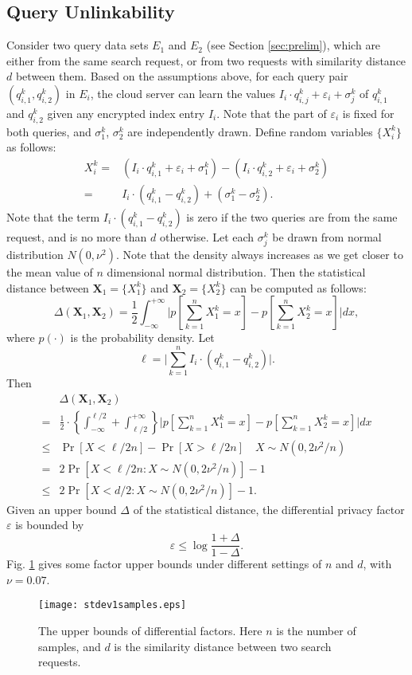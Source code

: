 \documentclass{IEEEtran}
\begin{document}
\subsection{Query Unlinkability}
Consider two query data sets $E_1$ and $E_2$ (see Section \ref{sec:prelim}), which are either from the same search request, or from two requests with similarity distance $d$ between them. Based on the assumptions above, for each query pair $(q_{i,1}^k,q_{i,2}^k)$ in $E_i$, the cloud server can learn the values $I_i\cdot q_{i,j}^k+\varepsilon_i+\sigma_j^k$ of $q_{i,1}^k$ and $q_{i,2}^k$ given any encrypted index entry $I_i$. Note that the part of $\varepsilon_i$ is fixed for both queries, and $\sigma_1^k$, $\sigma_2^k$ are independently drawn. Define random variables $\{X_i^k\}$ as follows:
$$
\begin{aligned}
X_i^k = &(I_i\cdot q_{i,1}^k+\varepsilon_i+\sigma_1^k) - (I_i\cdot q_{i,2}^k+\varepsilon_i+\sigma_2^k)\\
=&I_i\cdot(q_{i,1}^k-q_{i,2}^k)+(\sigma_1^k-\sigma_2^k).
\end{aligned}
$$
Note that the term $I_i\cdot(q_{i,1}^k-q_{i,2}^k)$ is zero if the two queries are from the same request, and is no more than $d$ otherwise. Let each $\sigma_j^k$ be drawn from normal distribution $N(0,\nu^2)$. Note that the density always increases as we get closer to the mean value of $n$ dimensional normal distribution. Then the statistical distance between $\mathbf{X}_1 = \{X_1^k\}$ and $\mathbf{X}_2 = \{X_2^k\}$ can be computed as follows:
$$\Delta(\mathbf{X}_1, \mathbf{X}_2) = \frac{1}{2}\int_{-\infty}^{+\infty}\bigg|p[\sum_{k=1}^n X_1^k = x] - p[\sum_{k=1}^n X_2^k = x]\bigg|dx,$$
where $p(\cdot)$ is the probability density. Let 
$$\ell = \bigg| \sum_{k=1}^n I_i\cdot(q_{i,1}^k-q_{i,2}^k) \bigg|.$$
Then
$$
\begin{aligned}
&\Delta(\mathbf{X}_1, \mathbf{X}_2) \\
=& \frac{1}{2}\cdot\left\{ \int_{-\infty}^{\ell/2} + \int_{\ell/2}^{+\infty} \right\} \bigg|p[\sum_{k=1}^n X_1^k = x] - p[\sum_{k=1}^n X_2^k = x]\bigg|dx \\
\leq& \Pr[X<\ell/2n] - \Pr[X>\ell/2n] \quad X\sim N(0,2\nu^2/n) \\
=& 2\Pr[X<\ell/2n: X\sim N(0,2\nu^2/n)]-1 \\
\leq& 2\Pr[X<d/2: X\sim N(0,2\nu^2/n)]-1.
\end{aligned}
$$
Given an upper bound $\Delta$ of the statistical distance, the differential privacy factor $\varepsilon$ is bounded by
$$\varepsilon \leq \log \frac{1+\Delta}{1-\Delta}.$$
Fig. \ref{fig:diff_factors} gives some factor upper bounds under different settings of $n$ and $d$, with $\nu=0.07$.

\begin{figure}
\centering
\texttt{[image: stdev1samples.eps]}
\caption{The upper bounds of differential factors. Here $n$ is the number of samples, and $d$ is the similarity distance between two search requests.}
\label{fig:diff_factors}
\end{figure}



\end{document}
